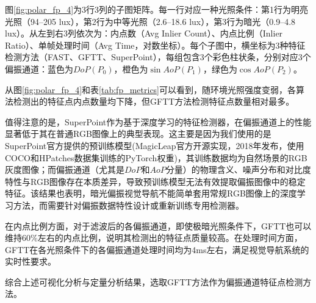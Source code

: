 图\ref{fig:polar_fp_4}为3行3列的子图矩阵。每一行对应一种光照条件：第1行为明亮光照（94--205 lux），第2行为中等光照（2.6--18.6 lux），第3行为暗光（0.9--4.8 lux）。从左到右3列依次为：内点数（Avg Inlier Count）、内点比例（Inlier Ratio）、单帧处理时间（Avg Time，对数坐标）。每个子图中，横坐标为3种特征检测方法（FAST、GFTT、SuperPoint），每组包含3个彩色柱状条，分别对应3个偏振通道：蓝色为$DoP(P_0)$，橙色为$\sin AoP(P_1)$，绿色为$\cos AoP(P_2)$。

从图\ref{fig:polar_fp_4}和表\ref{tab:fp_metrics}可以看到，随环境光照强度变弱，各算法检测出的特征点内点数量均下降，但GFTT方法检测特征点数量相对最多。

值得注意的是，SuperPoint作为基于深度学习的特征检测器，在偏振通道上的性能显著低于其在普通RGB图像上的典型表现。这主要是因为我们使用的是SuperPoint官方提供的预训练模型(MagicLeap官方开源实现\cite{deTone2018superpoint}，2018年发布，使用COCO和HPatches数据集训练的PyTorch权重)，其训练数据均为自然场景的RGB灰度图像；而偏振通道（尤其是$DoP$和$AoP$分量）的物理含义、噪声分布和对比度特性与RGB图像存在本质差异，导致预训练模型无法有效提取偏振图像中的稳定特征。该结果也表明，暗光偏振视觉导航不能简单套用常规RGB图像上的深度学习方法，而需要针对偏振数据特性设计或重新训练专用检测器。

在内点比例方面，对于滤波后的各偏振通道，即使极暗光照条件下，GFTT也可以维持60\%左右的内点比例，说明其检测出的特征点质量较高。在处理时间方面，GFTT在各光照条件下的各偏振通道处理时间均为4ms左右，满足视觉导航系统的实时性要求。

综合上述可视化分析与定量分析结果，选取GFTT方法作为偏振通道特征点检测方法。
